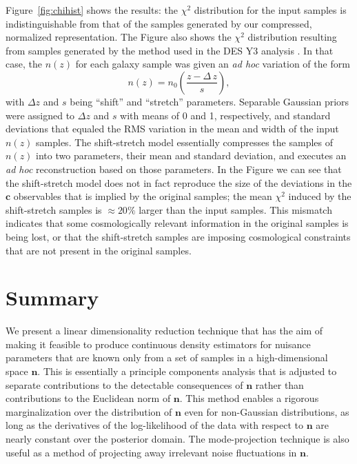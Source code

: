 \documentclass[linenumbers, onecolumn]{aastex63}
\newcommand{\vecc}{\ensuremath{\mathbf{c}}}
\newcommand{\vecn}{\ensuremath{\mathbf{n}}}
\begin{document}
Figure~\ref{fig:chihist} shows the results: the $\chi^2$ distribution
for the input samples is indistinguishable from that of the samples
generated by our compressed, normalized representation.
The Figure also shows the $\chi^2$ distribution resulting from samples
generated by the method used in the DES Y3 analysis \citep{y3pz}.  In
that case, the $n(z)$ for each galaxy sample was given an \textit{ad
  hoc} variation of the form
\begin{equation}
  n(z) = n_0\left(\frac{z-\Delta\,z}{s}\right),
  \label{eq:zs}
\end{equation}
with $\Delta z$ and $s$ being ``shift'' and ``stretch'' parameters.
Separable Gaussian priors were assigned to $\Delta z$ and $s$ with
means of 0 and 1, respectively, and standard deviations that equaled
the RMS variation in the mean and width of the input $n(z)$ samples.
The shift-stretch model essentially compresses the samples of $n(z)$
into two parameters, their mean and standard deviation, and executes
an \textit{ad hoc} reconstruction based on those parameters.
In the Figure we can see that the shift-stretch model does not in fact
reproduce the size of the deviations in the $\vecc$ observables that
is implied by the original samples; the mean $\chi^2$ induced by the
shift-stretch samples is $\approx20\%$ larger than the input samples.  
This mismatch indicates that some cosmologically relevant information in the
original samples is being lost, or that the shift-stretch samples are
imposing cosmological constraints that are not present in the original
samples.

\section{Summary}
  We present a linear dimensionality reduction technique that has the
  aim of making it feasible to produce continuous density estimators
  for nuisance parameters that are known only from a set of samples in
  a high-dimensional space $\vecn.$  This is essentially a principle
  components analysis that is adjusted to separate contributions to
  the detectable consequences of $\vecn$ rather than contributions to
  the Euclidean norm of $\vecn.$   This method enables a rigorous
  marginalization over the distribution of $\vecn$ even for
  non-Gaussian distributions, as long as the derivatives of the
  log-likelihood of the data with respect to $\vecn$ are nearly
  constant over the posterior domain.  The mode-projection technique
  is also useful as a method of projecting away irrelevant
  noise fluctuations in $\vecn.$
\end{document}
